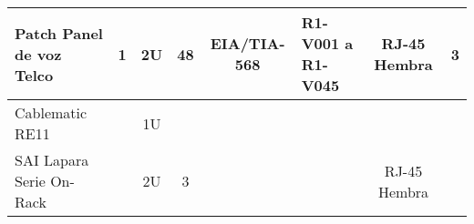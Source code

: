 \begin{table}[htbp]
\begin{tabular}{|p{2.5cm}|p{1.6cm}|llllll}
		Patch Panel de voz Telco                                           & \multicolumn{1}{c|}{1}                      & \multicolumn{1}{c|}{2U}              & \multicolumn{1}{c|}{48}                  & \multicolumn{1}{c|}{EIA/TIA-568}       & \multicolumn{1}{p{1.6cm}|}{R1-V001 a R1-V045}           & \multicolumn{1}{c|}{RJ-45 Hembra}              & \multicolumn{1}{c|}{3}                  \\ \hline
		Cablematic RE11                                                    &                           					 & \multicolumn{1}{c|}{1U}              & \multicolumn{1}{c|}{}                    & \multicolumn{1}{c|}{}                  & \multicolumn{1}{c|}{}                            & \multicolumn{1}{c|}{}                          & \multicolumn{1}{c|}{}                   \\ \hline
		SAI Lapara Serie On-Rack                                           &                          				     & \multicolumn{1}{c|}{2U}              & \multicolumn{1}{c|}{3}                   & \multicolumn{1}{c|}{}                  & \multicolumn{1}{c|}{}                            & \multicolumn{1}{c|}{RJ-45 Hembra}              & \multicolumn{1}{c|}{}                   \\ \hline
		
	\end{tabular}
\end{table}